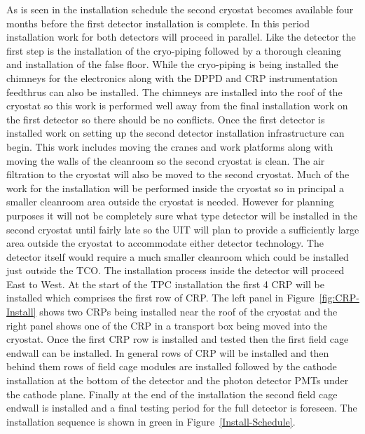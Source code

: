 As is seen in the installation schedule the second cryostat becomes
available four months before the first detector installation is
complete. In this period installation work for both detectors will
proceed in parallel. Like the  detector the first step is
the installation of the cryo-piping followed by a thorough cleaning
and installation of the false floor. While the cryo-piping is being
installed the  chimneys for the electronics along with the
DPPD and CRP instrumentation feedthrus can also be installed. The
chimneys are installed into the roof of the cryostat so this work is
performed well away from the final installation work on the first
detector so there should be no conflicts. Once the first detector is
installed work on setting up the second detector installation
infrastructure can begin. This work includes moving the cranes and
work platforms along with moving the walls of the cleanroom so the
second cryostat is clean. The air filtration to the cryostat will also
be moved to the second cryostat.  Much of the work for the 
installation will be performed inside the cryostat so in principal a
smaller cleanroom area outside the cryostat is needed. However for
planning purposes it will not be completely sure what type detector
will be installed in the second cryostat until fairly late so the UIT
will plan to provide a sufficiently large area outside the cryostat to
accommodate either detector technology.  The detector itself
would require a much smaller cleanroom which could be installed just
outside the TCO. The installation process inside the detector will
proceed East to West. At the start of the TPC installation the first
\num{4} CRP will be installed which comprises the first row of
CRP. The left panel in Figure~\ref{fig:CRP-Install} shows two CRPs
being installed near the roof of the cryostat and the right panel
shows one of the CRP in a transport box being moved into the cryostat.
Once the first CRP row is installed and tested then the first field
cage endwall can be installed. In general rows of CRP will be
installed and then behind them rows of field cage modules are
installed followed by the cathode installation at the bottom of the
detector and the photon detector PMTs under the cathode plane. Finally
at the end of the installation the second field cage endwall is
installed and a final testing period for the full detector is
foreseen. The  installation sequence is shown in green in
Figure~\ref{Install-Schedule}.
